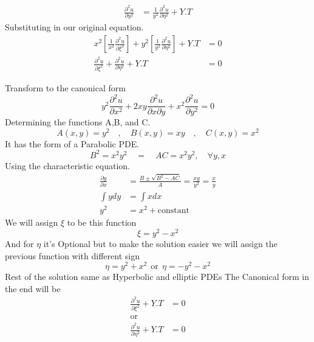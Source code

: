 \begin{example}
\begin{align*}
        \\
        \frac{\partial^2 u}{\partial y^2} &=\frac{1}{y^2}\frac{\partial^2 u}{\partial\eta^2}+Y.T
    \end{align*}
    Substituting in our original equation.
    \begin{align*}
        x^2\left[\frac{1}{x^2}\frac{\partial^2 u}{\partial\xi^2}\right]+y^2\left[\frac{1}{y^2}\frac{\partial^2 u}{\partial\eta^2}\right]+Y.T &= 0
        \\
        \frac{\partial^2 u}{\partial\xi^2}+\frac{\partial^2 u}{\partial\eta^2}+Y.T &=0
    \end{align*}
\end{example}
\begin{example}
    Transform to the canonical form
    \[
        y^2\frac{\partial^2 u}{\partial x^2}+2xy\frac{\partial^2 u}{\partial x\partial y}+x^2\frac{\partial^2 u}{\partial y^2} = 0  
    \]
    Determining the functions A,B, and C.
    \[
        A\left(x,y\right)=y^2  \quad,\quad  B\left(x,y\right)=xy  \quad,\quad  C\left(x,y\right)=x^2    
    \]
    It has the form of a Parabolic PDE.
    \[
        B^2 =x^2 y^2 \quad=\quad AC=x^2 y^2, \quad\forall y, x  
    \]
    Using the characteristic equation.
    \begin{align*}
        \frac{\partial y}{\partial x} &= \frac{B\pm\sqrt{B^2 -AC}}{A} = \frac{xy}{y^2}=\frac{x}{y}
        \\
        \int y dy &= \int x dx 
        \\
        y^2 &= x^2 +\text{constant}
    \end{align*}
    We will assign $\xi$ to be this function
    \[
        \xi = y^2 - x^2
    \]
    And for $\eta$ it's Optional but to make the solution easier we will assign the previous function with different sign  
    \[
        \eta = y^2 + x^2 \ \ \text{or} \ \ \eta = - y^2 - x^2
    \]
    Rest of the solution same as Hyperbolic and elliptic PDEs
    The Canonical form in the end will be 
    \begin{align*}
        \frac{\partial^2 u}{\partial\xi^2}+Y.T &=0
        \\
        \text{or}
        \\
        \frac{\partial^2 u}{\partial\eta^2}+Y.T &=0
    \end{align*}
\end{example}

